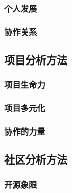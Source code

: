 \subsubsection{个人发展}



\subsubsection{协作关系}

\subsection{项目分析方法}
\subsubsection{项目生命力}

\subsubsection{项目多元化}

\subsubsection{协作的力量}

\subsection{社区分析方法}
\subsubsection{开源象限}

